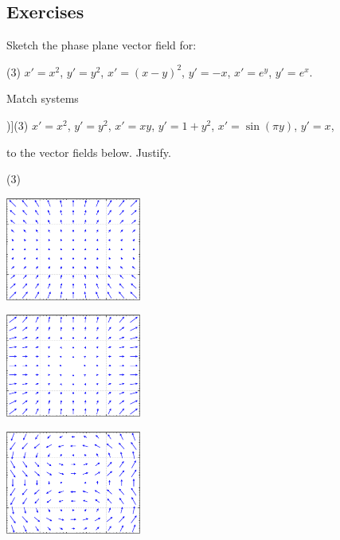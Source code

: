\subsection{Exercises}

\begin{exercise}
Sketch the phase plane vector field for:
\begin{tasks}(3)
\task $x'=x^2$, \enspace $y'=y^2$,
\task $x'=(x-y)^2$, \enspace $y'=-x$,
\task $x'=e^y$, \enspace $y'=e^x$.
\end{tasks}
\end{exercise}

\begin{samepage}
\begin{exercise}
Match systems
\begin{tasks}[counter-format=tsk[1])](3)
\task $x'=x^2$, \enspace $y'=y^2$,
\task $x'=xy$, \enspace $y'=1+y^2$,
\task $x'=\sin(\pi y)$, \enspace $y'=x$,
\end{tasks}
to the vector fields below.  Justify.
\begin{tasks}(3)
\task
\parbox[c]{1.75in}{\includegraphics[width=1.75in]{figures/nlin-exer-xy-1py2}}
\task
\parbox[c]{1.75in}{\includegraphics[width=1.75in]{figures/nlin-exer-x2-y2}}
\task
\parbox[c]{1.75in}{\includegraphics[width=1.75in]{figures/nlin-exer-sinpiy-x}}
\end{tasks}
\end{exercise}
\end{samepage}


